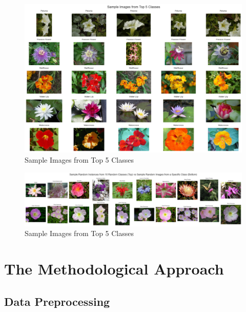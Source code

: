 \begin{figure}[h!]
    \centering
    \includegraphics[width=\linewidth]{Images/Sample Images from Top 5 Classes}
    \caption{Sample Images from Top 5 Classes}
\end{figure}

\begin{figure}[h!]
    \centering
    \includegraphics[width=\linewidth]{Images/Sample Random Instances from 10 Random Classes (Top) vs Sample Random Images from a Specific Class (Bottom)}
    \caption{Sample Images from Top 5 Classes}
\end{figure}


\section{The Methodological Approach}

\subsection{Data Preprocessing}

